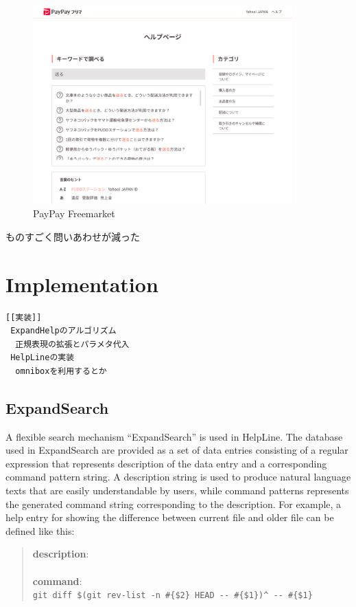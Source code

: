 \documentclass[manuscript,screen,review]{acmart}
\def\HL{\textsf{HelpLine}}
\def\ES{\textsf{ExpandSearch}}
\begin{document}
\begin{figure}[H]
  \centering
  \includegraphics[width=10cm,bb=0 0 1716 1312]{figures/3d964512606a5e25646104a738ab104e.png}
  \caption{PayPay Freemarket}
  \label{paypayhf}
\end{figure}

ものすごく問いあわせが減った

\section{Implementation}

\begin{verbatim}
[[実装]]
 ExpandHelpのアルゴリズム
  正規表現の拡張とパラメタ代入
 HelpLineの実装
  omniboxを利用するとか
\end{verbatim}

\subsection{ExpandSearch}

A flexible search mechanism ``{\ES}'' is used in {\HL}.
%
The database used in {\ES} are provided as a set of data entries
consisting of a regular expression that represents description of the data entry
and a corresponding command pattern string.
A description string is used to produce natural language texts
that are easily understandable by users,
while command patterns represents the generated command string
corresponding to the description.
%
For example, a help entry for showing the difference between
current file and older file can be defined like this:

\begin{quote}
  \textbf{description}: \\
  \\
  \textbf{command}: \\
  {\smallfont\verb|git diff $(git rev-list -n #{$2} HEAD -- #{$1})^ -- #{$1}|}
\end{quote}
\end{document}
